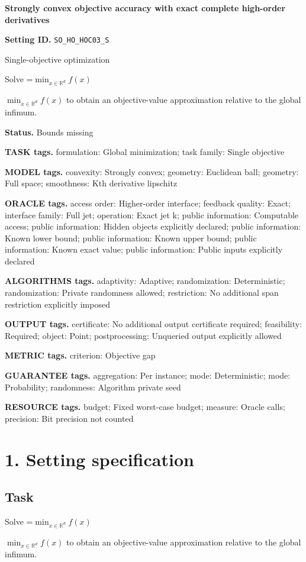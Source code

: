 \documentclass[10pt,a4paper]{article}
\newcommand{\AtlasMath}[1]{\par\begingroup\centering\setbox0=\hbox{$\displaystyle #1$}\ifdim\wd0>1.4\linewidth\typeout{ATLAS WIDE FORMULA: \the\wd0}\fi\ifdim\wd0>\linewidth\resizebox{\linewidth}{!}{\box0}\else\box0\fi\par\endgroup}
\newcommand{\AtlasInlineMath}[1]{\begingroup\setbox0=\hbox{$#1$}\ifdim\wd0>.4\linewidth\endgroup\AtlasMath{#1}\else\endgroup$#1$\fi}
\begin{document}
\raggedright

{\LARGE\bfseries\sffamily\color{AtlasNavy} Strongly convex objective accuracy with exact complete high-order derivatives\par}\vspace{5pt}
\textbf{Setting ID.} \texttt{SO\_\allowbreak{}HO\_\allowbreak{}HOC03\_\allowbreak{}S}

Single-objective optimization

Solve \AtlasInlineMath{\min_{x\in \mathbb{R}^d}f(x)} to obtain an objective-value approximation relative to the global infimum.

\textbf{Status.} Bounds missing

\textbf{TASK tags.} formulation: Global minimization; task family: Single objective

\textbf{MODEL tags.} convexity: Strongly convex; geometry: Euclidean ball; geometry: Full space; smoothness: Kth derivative lipschitz

\textbf{ORACLE tags.} access order: Higher-order interface; feedback quality: Exact; interface family: Full jet; operation: Exact jet k; public information: Computable access; public information: Hidden objects explicitly declared; public information: Known lower bound; public information: Known upper bound; public information: Known exact value; public information: Public inputs explicitly declared

\textbf{ALGORITHMS tags.} adaptivity: Adaptive; randomization: Deterministic; randomization: Private randomness allowed; restriction: No additional span restriction explicitly imposed

\textbf{OUTPUT tags.} certificate: No additional output certificate required; feasibility: Required; object: Point; postprocessing: Unqueried output explicitly allowed

\textbf{METRIC tags.} criterion: Objective gap

\textbf{GUARANTEE tags.} aggregation: Per instance; mode: Deterministic; mode: Probability; randomness: Algorithm private seed

\textbf{RESOURCE tags.} budget: Fixed worst-case budget; measure: Oracle calls; precision: Bit precision not counted

\section{1. Setting specification}
\subsection{Task}
Solve \AtlasInlineMath{\min_{x\in \mathbb{R}^d}f(x)} to obtain an objective-value approximation relative to the global infimum.
\end{document}
